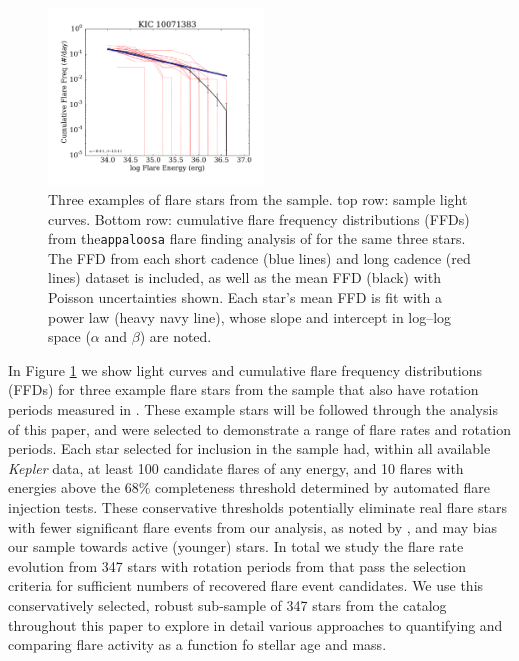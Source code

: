 \documentclass[preprint2]{aastex62}
\newcommand{\Kepler}{\textsl{Kepler}\xspace}
\begin{document}
\begin{figure}[!t]
\includegraphics[width=2.25in]{fig1f}
\caption{
Three examples of flare stars from the \citet{davenport2016} sample. top row: sample light curves. Bottom row: cumulative flare frequency distributions (FFDs) from the{\tt appaloosa} flare finding analysis of \citet{davenport2016} for the same three stars. The FFD from each short cadence (blue lines) and long cadence (red lines) dataset is included, as well as the mean FFD (black) with Poisson uncertainties shown. Each star's mean FFD is fit with a power law (heavy navy line), whose slope and intercept in log--log space ($\alpha$ and $\beta$) are noted.
}
\label{fig:ffd1}
\end{figure}





In Figure \ref{fig:ffd1} we show light curves and cumulative flare frequency distributions (FFDs) for three example flare stars from the \citet{davenport2016} sample that also have rotation periods measured in \citet{mcquillan2014}. These example stars will be followed through the analysis of this paper, and were selected to demonstrate a range of flare rates and rotation periods. 
Each star selected for inclusion in the \citet{davenport2016} sample had, within all available \Kepler data, at least 100 candidate flares of any energy, and 10 flares with energies above the 68\% completeness threshold determined by automated flare injection tests. These conservative thresholds potentially eliminate real flare stars with fewer significant flare events from our analysis, as noted by \citet{van-doorsselaere2017}, and may bias our sample towards active (younger) stars. 
In total we study the flare rate evolution from 347 stars with rotation periods from \citet{mcquillan2014} that pass the \citet{davenport2016} selection criteria for sufficient numbers of recovered flare event candidates. We use this conservatively selected, robust sub-sample of 347 stars from the \citet{davenport2016} catalog throughout this paper to explore in detail various approaches to quantifying and comparing flare activity as a function fo stellar age and mass.
\end{document}
